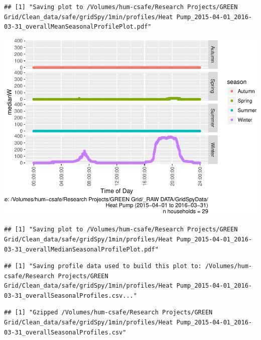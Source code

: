 \documentclass[]{article}
\begin{document}
\begin{verbatim}
## [1] "Saving plot to /Volumes/hum-csafe/Research Projects/GREEN Grid/Clean_data/safe/gridSpy/1min/profiles/Heat Pump_2015-04-01_2016-03-31_overallMeanSeasonalProfilePlot.pdf"
\end{verbatim}

\includegraphics{nzGGHouseholdPowerDemandProfile_Heat Pump_2015-04-01_2016-03-31_files/figure-latex/overall profiles by season-2.pdf}

\begin{verbatim}
## [1] "Saving plot to /Volumes/hum-csafe/Research Projects/GREEN Grid/Clean_data/safe/gridSpy/1min/profiles/Heat Pump_2015-04-01_2016-03-31_overallMedianSeasonalProfilePlot.pdf"
\end{verbatim}

\begin{verbatim}
## [1] "Saving profile data used to build this plot to: /Volumes/hum-csafe/Research Projects/GREEN Grid/Clean_data/safe/gridSpy/1min/profiles/Heat Pump_2015-04-01_2016-03-31_overallSeasonalProfiles.csv..."
\end{verbatim}

\begin{verbatim}
## [1] "Gzipped /Volumes/hum-csafe/Research Projects/GREEN Grid/Clean_data/safe/gridSpy/1min/profiles/Heat Pump_2015-04-01_2016-03-31_overallSeasonalProfiles.csv"
\end{verbatim}
\end{document}

